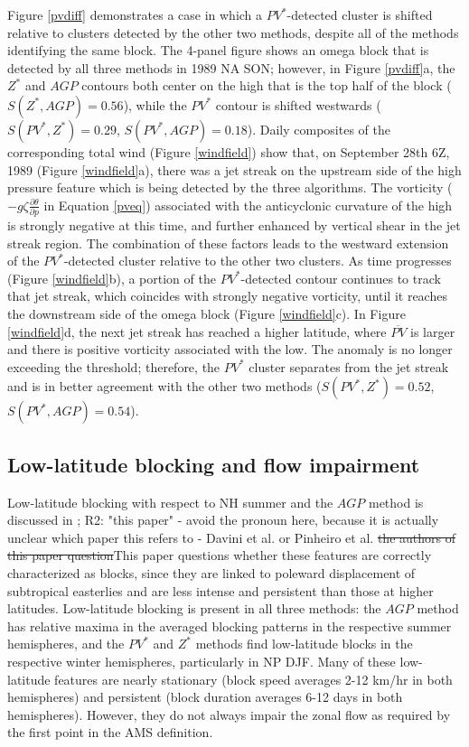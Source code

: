 \documentclass[smallextended]{svjour3}       %
\numberwithin{equation}{section}
\begin{document}
Figure \ref{pvdiff} demonstrates a case in which a $PV^*$-detected cluster is shifted relative to clusters detected by the other two methods, despite all of the methods identifying the same block. The 4-panel figure shows an omega block that is detected by all three methods in 1989 NA SON; however, in Figure \ref{pvdiff}a, the $Z^*$ and $AGP$ contours both center on the high that is the top half of the block ($S(Z^*, AGP)=0.56$), while the $PV^*$ contour is shifted westwards ($S(PV^*, Z^*)=0.29$, $S(PV^*, AGP)=0.18$). Daily composites of the corresponding total wind (Figure \ref{windfield}) show that, on September 28th 6Z, 1989 (Figure \ref{windfield}a), there was a jet streak on the upstream side of the high pressure feature which is being detected by the three algorithms. The vorticity ($-g\zeta \frac{\partial \theta}{\partial p}$ in Equation \ref{pveq}) associated with the anticyclonic curvature of the high is strongly negative at this time, and further enhanced by vertical shear in the jet streak region. The combination of these factors leads to the westward extension of the $PV^*$-detected cluster relative to the other two clusters. As time progresses (Figure \ref{windfield}b), a portion of the  $PV^*$-detected contour continues to track that jet streak, which coincides with strongly negative vorticity, until it reaches the downstream side of the omega block (Figure \ref{windfield}c). In Figure \ref{windfield}d, the next jet streak has reached a higher latitude, where $\overline{PV}$ is larger and there is positive vorticity associated with the low. The anomaly is no longer exceeding the threshold; therefore, the $PV^*$ cluster separates from the jet streak and is in better agreement with the other two methods ($S(PV^*, Z^*)=0.52$, $S(PV^*, AGP)=0.54$). 

\subsection{Low-latitude blocking and flow impairment}\label{lowlatsec}

Low-latitude blocking with respect to NH summer and the $AGP$ method is discussed in \citep{davini_bidimensional_2012};
{\color{teal}R2: "this paper" - avoid the pronoun here, because it is actually unclear which paper this refers to - Davini et al. or Pinheiro et al.}
{\color{blue}\sout{the authors of this paper question}This paper questions} whether these features are correctly characterized as blocks, since they are linked to poleward displacement of subtropical easterlies and are less intense and persistent than those at higher latitudes. Low-latitude blocking is present in all three methods: the $AGP$ method has relative maxima in the averaged blocking patterns in the respective summer hemispheres, and the $PV^*$ and $Z^*$ methods find low-latitude blocks in the respective winter hemispheres, particularly in NP DJF. Many of these low-latitude features are nearly stationary (block speed averages 2-12 km/hr in both hemispheres) and persistent (block duration averages 6-12 days in both hemispheres). However, they do not always impair the zonal flow as required by the first point in the AMS definition.
\end{document}
